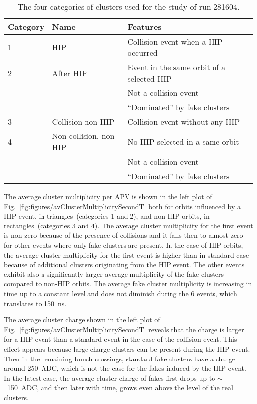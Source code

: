 \begin{table}[h]
\begin{center}
\begin{tabular}{|l|l|l|}
\hline
Category & Name  & Features \\
\hline
1 & HIP & Collision event when a HIP occurred \\
\hline
2 & After HIP & Event in the same orbit of a selected HIP \\
& & Not a collision event \\
& & ``Dominated'' by fake clusters \\
\hline
3 & Collision non-HIP & Collision event without any HIP \\
\hline
4 & Non-collision, non-HIP  & No HIP selected in a same orbit \\
& & Not a collision event \\
& & ``Dominated'' by fake clusters \\
\hline
\end{tabular}
\caption[Table caption text]{The four categories of clusters used for the study of run 281604. }
\label{tab:eventCategories}
\end{center}
\end{table}

The average cluster multiplicity per APV is shown in the left plot of Fig.~\ref{fig:figures/avClusterMultiplicitySecondT} both for orbits influenced by a HIP event, in triangles~(categories 1 and 2), and non-HIP orbits, in rectangles~(categories 3 and 4). The average cluster multiplicity for the first event is non-zero because of the presence of collisions and it falls then to almost zero for other events where only fake clusters are present. In the case of HIP-orbits, the average cluster multiplicity for the first event is higher than in standard case because of additional clusters originating from the HIP event. The other events exhibit also a significantly larger average multiplicity of the fake clusters compared to non-HIP orbits. The average fake cluster multiplicity is increasing in time up to a constant level and does not diminish during the 6 events, which translates to 150~ns. 

The average cluster charge shown in the left plot of Fig.~\ref{fig:figures/avClusterMultiplicitySecondT} reveals that the charge is larger for a HIP event than a standard event in the case of the collision event. This effect appears because large charge clusters can be present during the HIP event. Then in the remaining bunch crossings, standard fake clusters have a charge around 250~ADC, which is not the case for the fakes induced by the HIP event. In the latest case, the average cluster charge of fakes first drops up to $\sim$~150~ADC, and then later with time, grows even above the level of the real clusters. 


